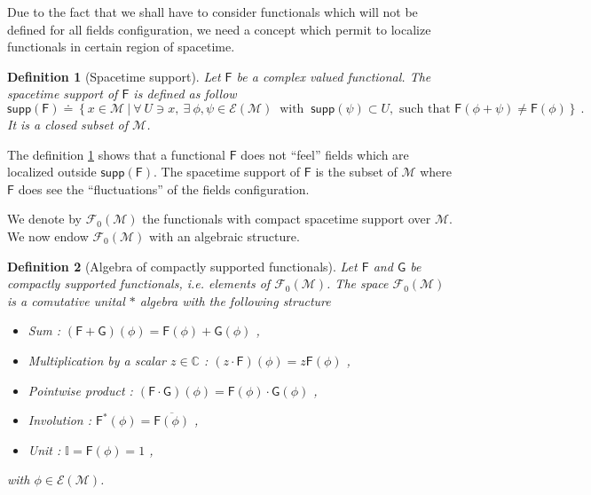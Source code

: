 \documentclass[10pt]{book}
\newcommand{\supp}{\mathsf{supp}}
\newcommand{\Ecal}{\mathcal{E}}
\newcommand{\Fcal}{\mathcal{F}}
\newcommand{\Mcal}{\mathcal{M}}
\newcommand{\Cbb}{\mathbb{C}}
\newcommand{\Ibb}{\mathbb{I}}
\newcommand{\Fsf}{\mathsf{F}}
\newcommand{\Gsf}{\mathsf{G}}
\theoremstyle{break}
\newtheorem{definition}{Definition}
\begin{document}
\bigskip


Due to the fact that we shall have to consider functionals which will not be defined for all fields configuration, we need a concept which permit to localize functionals in certain region of spacetime.


\begin{definition}[Spacetime support] \label{def:spacetime_supp}
Let $\Fsf$ be a complex valued functional. The spacetime support of $\Fsf$ is defined as follow
%
\begin{equation*}
\supp(\Fsf) \doteq \left\{ x \in \Mcal \ \bigg| \ 
\forall \ U \ni x , \ \exists \ \phi, \psi \in \Ecal(\Mcal) \ \mbox{ with } \ \supp(\psi) \subset U, \mbox{ such that } \Fsf(\phi + \psi) \neq \Fsf(\phi)
\right\} \ .
\end{equation*}
It is a closed subset of $\Mcal$.
%
\end{definition}


The definition \ref{def:spacetime_supp} shows that a functional $\Fsf$ does not ``feel'' fields which are localized outside $\supp(\Fsf)$. The spacetime support of $\Fsf$ is the subset of $\Mcal$ where $\Fsf$ does see the ``fluctuations'' of the fields configuration.


\bigskip


We denote by $\Fcal_0(\Mcal)$ the functionals with compact spacetime support over $\Mcal$. We now endow $\Fcal_0(\Mcal)$ with an algebraic structure. 


\begin{definition}[Algebra of compactly supported functionals] \label{def:algebra_comp_supp_func}
Let $\Fsf$ and $\Gsf$ be compactly supported functionals, i.e. elements of $\Fcal_0(\Mcal)$. The space $\Fcal_0(\Mcal)$ is a comutative unital $\ast$ algebra with the following structure
%
\begin{itemize}
\item Sum : $(\Fsf+\Gsf)(\phi) = \Fsf(\phi) + \Gsf(\phi)$ ,
\item Multiplication by a scalar $z\in\Cbb$ : $(z \cdot \Fsf)(\phi) = z \Fsf(\phi)$ ,
\item Pointwise product : $(\Fsf \cdot \Gsf)(\phi) = \Fsf(\phi) \cdot \Gsf(\phi)$ ,
\item Involution : $\Fsf^\ast(\phi) = \overline{\Fsf(\phi)}$ ,
\item Unit : $\Ibb = \Fsf(\phi) = 1$ ,
\end{itemize}
%
with $\phi \in \Ecal(\Mcal)$.
\end{definition}
\end{document}
